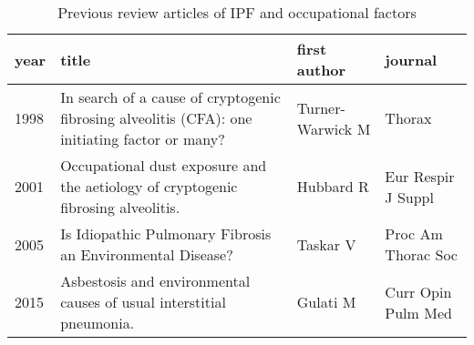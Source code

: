 \documentclass[a4paper,12pt]{article}
\begin{document}
\begin{table}
    \label{table:reviews}
    \begin{tabular}{lp{6cm}ll}
    \textbf{year} & \textbf{title} &       \textbf{first author} &            \textbf{journal} \\
    \midrule
    1998    &  In search of a cause of cryptogenic fibrosing alveolitis (CFA): one initiating factor or many?       &  Turner-Warwick M &              Thorax \\
    2001    &               Occupational dust exposure and the aetiology of cryptogenic fibrosing alveolitis. &         Hubbard R &  Eur Respir J Suppl \\
    2005    &  Is Idiopathic Pulmonary Fibrosis an Environmental Disease?
            &          Taskar V &  Proc Am Thorac Soc \\
    2015    &                            Asbestosis and environmental causes of usual interstitial pneumonia.  &          Gulati M &  Curr Opin Pulm Med \\
    \bottomrule
    \end{tabular}
    \caption{Previous review articles of IPF and occupational factors}
\end{table}
\end{document}
